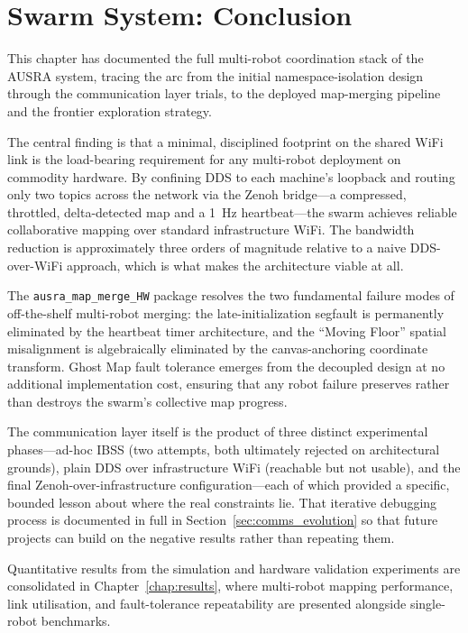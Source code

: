 \section{Swarm System: Conclusion}
\label{sec:swarm_conclusion}

This chapter has documented the full multi-robot coordination stack of the AUSRA system, tracing the arc from the initial namespace-isolation design through the communication layer trials, to the deployed map-merging pipeline and the frontier exploration strategy.

The central finding is that a minimal, disciplined footprint on the shared WiFi link is the load-bearing requirement for any multi-robot deployment on commodity hardware. By confining DDS to each machine's loopback and routing only two topics across the network via the Zenoh bridge---a compressed, throttled, delta-detected map and a 1~Hz heartbeat---the swarm achieves reliable collaborative mapping over standard infrastructure WiFi. The bandwidth reduction is approximately three orders of magnitude relative to a naive DDS-over-WiFi approach, which is what makes the architecture viable at all.

The \texttt{ausra\_map\_merge\_HW} package resolves the two fundamental failure modes of off-the-shelf multi-robot merging: the late-initialization segfault is permanently eliminated by the heartbeat timer architecture, and the ``Moving Floor'' spatial misalignment is algebraically eliminated by the canvas-anchoring coordinate transform. Ghost Map fault tolerance emerges from the decoupled design at no additional implementation cost, ensuring that any robot failure preserves rather than destroys the swarm's collective map progress.

The communication layer itself is the product of three distinct experimental phases---ad-hoc IBSS (two attempts, both ultimately rejected on architectural grounds), plain DDS over infrastructure WiFi (reachable but not usable), and the final Zenoh-over-infrastructure configuration---each of which provided a specific, bounded lesson about where the real constraints lie. That iterative debugging process is documented in full in Section~\ref{sec:comms_evolution} so that future projects can build on the negative results rather than repeating them.

Quantitative results from the simulation and hardware validation experiments are consolidated in Chapter~\ref{chap:results}, where multi-robot mapping performance, link utilisation, and fault-tolerance repeatability are presented alongside single-robot benchmarks.
